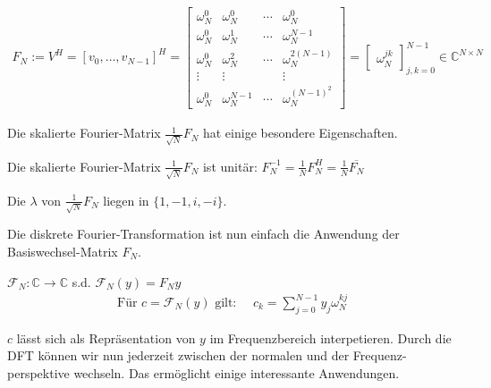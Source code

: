 \newpage

\\
\begin{align*}
    F_N := V^H = [v_0, \ldots, v_{N-1}]^H = \begin{bmatrix}
        \omega_N^0 & \omega_N^0 & \cdots & \omega_N^0 \\
        \omega_N^0 & \omega_N^1 & \cdots & \omega_N^{N-1} \\
        \omega_N^0 & \omega_N^2 & \cdots & \omega_N^{2(N-1)} \\
        \vdots     & \vdots     &        & \vdots \\
        \omega_N^0 & \omega_N^{N-1} &\cdots & \omega_N^{(N-1)^2} 
    \end{bmatrix}
    = 
    \begin{bmatrix}
        \omega_N^{jk}
    \end{bmatrix}^{N-1}_{j,k = 0} 
    \in \mathbb{C}^{N\times N}
\end{align*}

Die skalierte Fourier-Matrix $\frac{1}{\sqrt{N}}F_N$ hat einige besondere Eigenschaften.

\setcounter{all}{6}
\inlinetheorem Die skalierte Fourier-Matrix $\frac{1}{\sqrt{N}}F_N$ ist unitär: $F_N^{-1} = \frac{1}{N} F_N^H = \frac{1}{N} \overline{F_N}$

 Die $\lambda$ von $\frac{1}{\sqrt{N}}F_N$ liegen in $\{1,-1,i,-i\}$.

Die diskrete Fourier-Transformation ist nun einfach die Anwendung der Basiswechsel-Matrix $F_N$.

\setcounter{all}{5}
 $\mathcal{F}_N: \mathbb{C} \to \mathbb{C}$ s.d. $\mathcal{F}_N(y) = F_Ny$
\begin{align*}
    \text{Für } c = \mathcal{F}_N(y) \text{ gilt: }\quad c_k = \sum_{j=0}^{N-1} y_j \omega_N^{kj}
\end{align*}

$c$ lässt sich als Repräsentation von $y$ im Frequenzbereich interpetieren. Durch die DFT können wir nun jederzeit zwischen der normalen und der Frequenz-perspektive wechseln. Das ermöglicht einige interessante Anwendungen.

